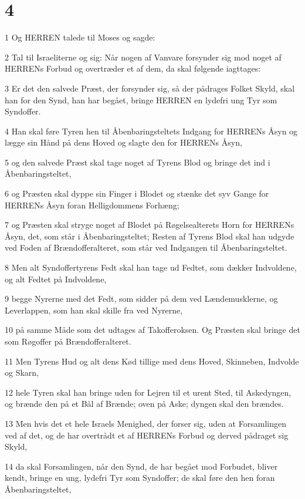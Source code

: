 \chapter{4}

\par 1 Og HERREN talede til Moses og sagde:
\par 2 Tal til Israeliterne og sig: Når nogen af Vanvare forsynder sig mod noget af HERRENs Forbud og overtræder et af dem, da skal følgende iagttages:
\par 3 Er det den salvede Præst, der forsynder sig, så der pådrages Folket Skyld, skal han for den Synd, han har begået, bringe HERREN en lydefri ung Tyr som Syndoffer.
\par 4 Han skal føre Tyren hen til Åbenbaringsteltets Indgang for HERRENs Åsyn og lægge sin Hånd på dens Hoved og slagte den for HERRENs Åsyn,
\par 5 og den salvede Præst skal tage noget af Tyrens Blod og bringe det ind i Åbenbaringsteltet,
\par 6 og Præsten skal dyppe sin Finger i Blodet og stænke det syv Gange for HERRENs Åsyn foran Helligdommens Forhæng;
\par 7 og Præsten skal stryge noget af Blodet på Røgelsealterets Horn for HERRENs Åsyn, det, som står i Åbenbaringsteltet; Resten af Tyrens Blod skal han udgyde ved Foden af Brændofferalteret, som står ved Indgangen til Åbenbaringsteltet.
\par 8 Men alt Syndoffertyrens Fedt skal han tage ud Fedtet, som dækker Indvoldene, og alt Fedtet på Indvoldene,
\par 9 begge Nyrerne med det Fedt, som sidder på dem ved Lændemusklerne, og Leverlappen, som han skal skille fra ved Nyrerne,
\par 10 på samme Måde som det udtages af Takofferoksen. Og Præsten skal bringe det som Røgoffer på Brændofferalteret.
\par 11 Men Tyrens Hud og alt dens Kød tillige med dens Hoved, Skinneben, Indvolde og Skarn,
\par 12 hele Tyren skal han bringe uden for Lejren til et urent Sted, til Askedyngen, og brænde den på et Bål af Brænde; oven på Aske; dyngen skal den brændes.
\par 13 Men hvis det et hele Israels Menighed, der forser sig, uden at Forsamlingen ved af det, og de har overtrådt et af HERRENs Forbud og derved pådraget sig Skyld,
\par 14 da skal Forsamlingen, når den Synd, de har begået mod Forbudet, bliver kendt, bringe en ung, lydefri Tyr som Syndoffer; de skal føre den hen foran Åbenbaringsteltet,
